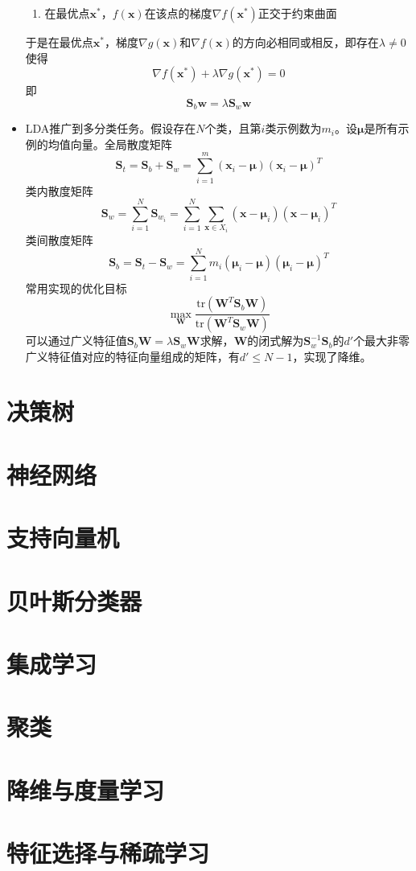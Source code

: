 \documentclass{ctexart}
\begin{document}
\begin{itemize}
\begin{framed}
\begin{enumerate}[(1)]
								\item 在最优点$\bm{x}^*$，$f(\bm{x})$在该点的梯度$\nabla f(\bm{x}^*)$正交于约束曲面
							\end{enumerate}于是在最优点$\bm{x}^*$，梯度$\nabla g(\bm{x})$和$\nabla f(\bm{x})$的方向必相同或相反，即存在$\lambda\neq0$使得\[\nabla f(\bm{x}^*)+\lambda\nabla g(\bm{x}^*)=0\]即\[\bm{S}_b\bm{w}=\lambda\bm{S}_w\bm{w}\]
						\end{framed}
						\item LDA推广到多分类任务。假设存在$N$个类，且第$i$类示例数为$m_i$。设$\bm{\mu}$是所有示例的均值向量。全局散度矩阵\[\bm{S}_t=\bm{S}_b+\bm{S}_w=\sum_{i=1}^{m}(\bm{x}_i-\bm{\mu})(\bm{x}_i-\bm{\mu})^T\]类内散度矩阵\[\bm{S}_w=\sum_{i=1}^{N}\bm{S}_{w_i}=\sum_{i=1}^{N}\sum_{\bm{x}\in X_i}^{}(\bm{x}-\bm{\mu}_i)(\bm{x}-\bm{\mu}_i)^T\]类间散度矩阵\[\bm{S}_b=\bm{S}_t-\bm{S}_w=\sum_{i=1}^{N}m_i(\bm{\mu}_i-\bm{\mu})(\bm{\mu}_i-\bm{\mu})^T\]常用实现的优化目标\[\max\limits_{\bm{W}}\frac{\mathrm{tr}(\bm{W}^T\bm{S}_b\bm{W})}{\mathrm{tr}(\bm{W}^T\bm{S}_w\bm{W})}\]可以通过广义特征值$\bm{S}_b\bm{W}=\lambda\bm{S}_w\bm{W}$求解，$\bm{W}$的闭式解为$\bm{S}_w^{-1}\bm{S}_b$的$d'$个最大非零广义特征值对应的特征向量组成的矩阵，有$d'\le N-1$，实现了降维。
					\end{itemize}
			\section{决策树}
			\section{神经网络}
			\section{支持向量机}
			\section{贝叶斯分类器}
			\section{集成学习}
			\section{聚类}
			\section{降维与度量学习}
			\section{特征选择与稀疏学习}
\end{document}

